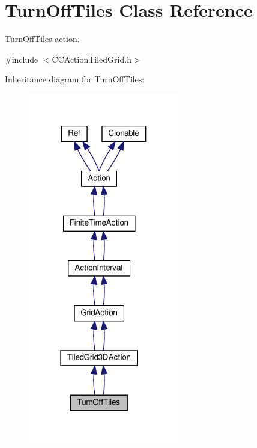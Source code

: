 \hypertarget{classTurnOffTiles}{}\section{Turn\+Off\+Tiles Class Reference}
\label{classTurnOffTiles}


\hyperlink{classTurnOffTiles}{Turn\+Off\+Tiles} action.  




{\ttfamily \#include $<$C\+C\+Action\+Tiled\+Grid.\+h$>$}



Inheritance diagram for Turn\+Off\+Tiles\+:
\nopagebreak
\begin{figure}[H]
\begin{center}
\leavevmode
\includegraphics[width=187pt]{classTurnOffTiles__inherit__graph}
\end{center}
\end{figure}



